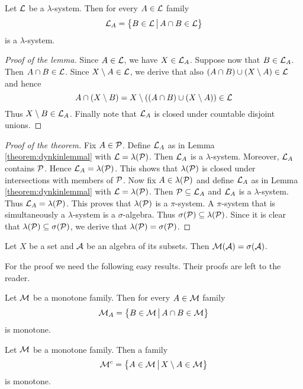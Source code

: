 \begin{lemma}\label{theorem:dynkinlemmal}
Let ${\mathcal L}$ be a $\lambda$-system. Then for every $A\in {\mathcal L}$ family
$${\mathcal L}_A=\big\{B\in {\mathcal L}\,\big|\,A\cap B\in {\mathcal L} \big\}$$
is a $\lambda$-system.
\end{lemma}
\begin{proof}[Proof of the lemma]
Since $A\in {\mathcal L}$, we have $X\in {\mathcal L}_A$. Suppose now that $B\in {\mathcal L}_A$. Then $A\cap B\in {\mathcal L}$. Since $X\setminus A\in {\mathcal L}$, we derive that also $(A\cap B)\cup (X\setminus A)\in {\mathcal L}$ and hence
$$A\cap (X\setminus B)=X\setminus \left(\left(A\cap B\right)\cup (X\setminus A)\right)\in {\mathcal L}$$
Thus $X\setminus B\in {\mathcal L}_A$. Finally note that ${\mathcal L}_A$ is closed under countable disjoint unions. 
\end{proof}

\begin{proof}[Proof of the theorem]
Fix $A\in {\mathcal P}$. Define ${\mathcal L}_A$ as in Lemma \ref{theorem:dynkinlemmal} with ${\mathcal L} = \lambda({\mathcal P})$. Then ${\mathcal L}_A$ is a $\lambda$-system. Moreover, ${\mathcal L}_A$ contains ${\mathcal P}$. Hence ${\mathcal L}_A=\lambda({\mathcal P})$. This shows that $\lambda({\mathcal P})$ is closed under intersections with members of ${\mathcal P}$. Now fix $A\in \lambda({\mathcal P})$ and define ${\mathcal L}_A$ as in Lemma \ref{theorem:dynkinlemmal} with ${\mathcal L} = \lambda({\mathcal P})$. Then ${\mathcal P}\subseteq {\mathcal L}_A$ and ${\mathcal L}_A$ is a $\lambda$-system. Thus ${\mathcal L}_A=\lambda({\mathcal P})$. This proves that $\lambda({\mathcal P})$ is a $\pi$-system. A $\pi$-system that is simultaneously a $\lambda$-system is a $\sigma$-algebra. Thus $\sigma({\mathcal P})\subseteq \lambda({\mathcal P})$. Since it is clear that $\lambda({\mathcal P})\subseteq \sigma({\mathcal P})$, we derive that $\lambda({\mathcal P})=\sigma({\mathcal P})$.
\end{proof}

\begin{theorem}\label{theorem:monotoneclasses}
Let $X$ be a set and ${\mathcal A}$ be an algebra of its subsets. Then ${\mathcal M}({\mathcal A})=\sigma({\mathcal A})$.
\end{theorem}
\noindent
For the proof we need the following easy results. Their proofs are left to the reader.

\begin{lemma}\label{lemma:firstmonotoneclasses}
Let ${\mathcal M}$ be a monotone family. Then for every $A\in {\mathcal M}$ family
$${\mathcal M}_A=\big\{B\in {\mathcal M}\,\big|\,A\cap B\in {\mathcal M}\big\}$$
is monotone.
\end{lemma}

\begin{lemma}\label{lemma:secondmonotoneclasses}
Let ${\mathcal M}$ be a monotone family. Then a family
$${\mathcal M}^c=\big\{A\in {\mathcal M}\,\big|\,X\setminus A\in {\mathcal M}\big\}$$
is monotone.
\end{lemma}

